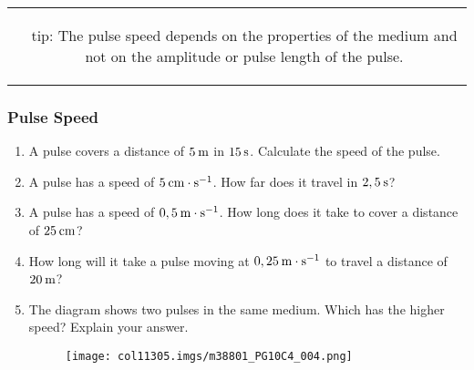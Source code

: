     \noindent
\label{m38801*notfhsst!!!underscore!!!id259}
\begin{tabular}{cc}
	   \hspace*{-50pt}\raisebox{-8 mm}{ \texttt{[image: col11305.imgs/pstip2.png]}  }& 
	\begin{minipage}{0.85\textwidth}
	\begin{note}
      {tip: }The pulse speed depends on the properties of the medium and not on the amplitude or pulse length of the pulse.
	\end{note}
	\end{minipage}
	\end{tabular}
	\par
\label{m38801*secfhsst!!!underscore!!!id260}
            \subsubsection{  Pulse Speed }
            \nopagebreak
        \label{m38801*id313813}\begin{enumerate}[noitemsep, label=\textbf{\arabic*}. ] 
            \label{m38801*uid7}\item A pulse covers a distance of $5\phantom{\rule{2pt}{0ex}}\mathrm{m}$ in $15\phantom{\rule{2pt}{0ex}}\mathrm{s}$. Calculate the speed of the pulse.\newline
\label{m38801*uid8}\item A pulse has a speed of $5\phantom{\rule{2pt}{0ex}}\mathrm{cm}\ensuremath{\cdot}\mathrm{s}{}^{-1}$. How far does it travel in $2,5\phantom{\rule{2pt}{0ex}}\mathrm{s}$?\newline
\label{m38801*uid9}\item A pulse has a speed of $0,5\phantom{\rule{2pt}{0ex}}\mathrm{m}\ensuremath{\cdot}\mathrm{s}{}^{-1}$. How long does it take to cover a distance of $25\phantom{\rule{2pt}{0ex}}\mathrm{cm}$?\newline
\label{m38801*uid10}\item How long will it take a pulse moving at $0,25\phantom{\rule{2pt}{0ex}}\mathrm{m}\ensuremath{\cdot}\mathrm{s}{}^{-1}$ to travel a distance of $20\phantom{\rule{2pt}{0ex}}\mathrm{m}$?\newline
\label{m38801*uid11}\item The diagram shows two pulses in the same medium. Which has the higher speed? Explain your answer.
    \setcounter{subfigure}{0}
	\begin{figure}[H] %
    \begin{center}
    \label{m38801*id313945!!!underscore!!!media}\label{m38801*id313945!!!underscore!!!printimage}\texttt{[image: col11305.imgs/m38801\_PG10C4\_004.png]} %
      \vspace{2pt}
    \vspace{.1in}
    \end{center}
 \end{figure}               \end{enumerate}
